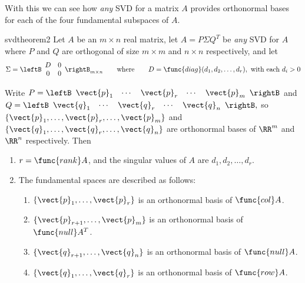 With this we can see how \emph{any} SVD for a matrix $A$ provides orthonormal bases for each of the four fundamental subspaces of $A$.

\begin{theorem}{}{svdtheorem2}
Let $A$ be an $m\times n$ real matrix, let $A=P\Sigma Q^{T}$ be \emph{any} SVD for $A$ where $P$ and $Q$ are orthogonal of size $m\times m$ and $n\times n$ respectively, and let
\begin{equation*} 
\Sigma =
\leftB 
\begin{array}{cc}
D & 0 \\ 
0 & 0
\end{array}
\rightB_{m\times n}\qquad  \mbox{where} \qquad D=\func{diag}(d_{1},d_{2},\ldots ,d_{r}), \mbox{ with each } d_{i}>0
\end{equation*}

\noindent Write $P=\leftB \begin{array}{ccccc}\vect{p}_{1} & \cdots & \vect{p}_{r} & \cdots & \vect{p}_{m}\end{array}\rightB$ and $Q=\leftB \begin{array}{ccccc}\vect{q}_{1} & \cdots & \vect{q}_{r} & \cdots & \vect{q}_{n}\end{array}\rightB,$ so $\{\vect{p}_{1},\ldots ,\vect{p}_{r},\ldots ,\vect{p}_{m}\}$ and $\{\vect{q}_{1},\ldots ,\vect{q}_{r},\ldots ,\vect{q}_{n}\}$ are orthonormal bases of $\RR^{m}$ and $\RR^{n}$ respectively. Then
\begin{enumerate}
\item $r=\func{rank}A$, and the singular values of $A$ are $d_{1},d_{2},\ldots ,d_{r}$.

\item The fundamental spaces are described as follows:
\begin{enumerate}[label=\alph*.]
\item $\{\vect{p}_{1},\ldots ,\vect{p}_{r}\}$ is an orthonormal basis of $\func{col}A$.

\item $\{\vect{p}_{r+1},\ldots ,\vect{p}_{m}\}$ is an
orthonormal basis of $\func{null}A^{T}$.

\item $\{\vect{q}_{r+1},\ldots ,\vect{q}_{n}\}$ is an
orthonormal basis of $\func{null}A$.

\item $\{\vect{q}_{1},\ldots ,\vect{q}_{r}\}$ is an
orthonormal basis of $\func{row}A$.
\end{enumerate}
\end{enumerate}
\end{theorem}

